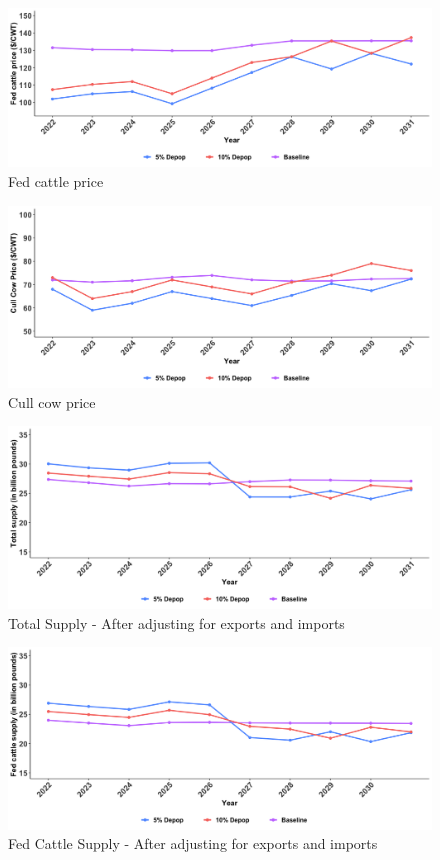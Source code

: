 \documentclass[
]{article}
\begin{document}
\begin{figure}
  \includegraphics[width=1.1\linewidth]{FMD-SimulationPlots/09-02/PsPES.png}
  \caption{Fed cattle price}
\end{figure}

\begin{figure}
  \includegraphics[width=1.1\linewidth]{FMD-SimulationPlots/09-02/PcPES.png}
  \caption{Cull cow price}
\end{figure}

\begin{figure}
  \includegraphics[width=1.1\linewidth]{FMD-SimulationPlots/09-02/TotSupplyPESDOM.png}
  \caption{Total Supply - After adjusting for exports and imports}
\end{figure}

\begin{figure}
  \includegraphics[width=1.1\linewidth]{FMD-SimulationPlots/09-02/SlSupplyPESDom.png}
  \caption{Fed Cattle Supply - After adjusting for exports and imports}
\end{figure}
\end{document}
